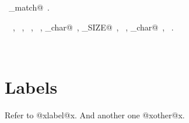 \documentclass{report}
\begin{document}
\begin{flushleft}
\begin{minipage}{\linewidth}
\begin{list}{}{\setlength{\itemsep}{-\parsep}\setlength{\itemindent}{-\leftmargin}}
\end{list}
\vspace{-2ex}
\footnotesize\addtolength{\baselineskip}{-1ex}
\begin{list}{}{\setlength{\itemsep}{-\parsep}\setlength{\itemindent}{-\leftmargin}}
\item \NWtxtIdentsDefed\nobreak\  \verb@reject_match@\nobreak\ .\end{list}
\vspace{-2ex}
\footnotesize\addtolength{\baselineskip}{-1ex}
\begin{list}{}{\setlength{\itemsep}{-\parsep}\setlength{\itemindent}{-\leftmargin}}
\item \NWtxtIdentsUsed\nobreak\  \verb@FALSE@\nobreak\ , \verb@first@\nobreak\ , \verb@Manager@\nobreak\ , \verb@Name@\nobreak\ , \verb@op_char@\nobreak\ , \verb@SLAB_SIZE@\nobreak\ , \verb@strlen@\nobreak\ , \verb@sym_char@\nobreak\ , \verb@TRUE@\nobreak\ .\end{list}
\end{minipage}\\[4ex]
\end{flushleft}
\section{Labels}

Refer to @xlabel@x.
And another one @xother@x.
\end{document}
